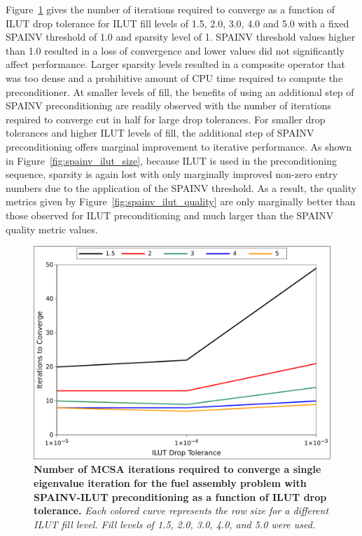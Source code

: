 Figure~\ref{fig:spainv_ilut_iterations} gives the number of iterations
required to converge as a function of ILUT drop tolerance for ILUT
fill levels of 1.5, 2.0, 3.0, 4.0 and 5.0 with a fixed SPAINV
threshold of 1.0 and sparsity level of 1. SPAINV threshold values
higher than 1.0 resulted in a loss of convergence and lower values did
not significantly affect performance. Larger sparsity levels resulted
in a composite operator that was too dense and a prohibitive amount of
CPU time required to compute the preconditioner. At smaller levels of
fill, the benefits of using an additional step of SPAINV
preconditioning are readily observed with the number of iterations
required to converge cut in half for large drop tolerances. For
smaller drop tolerances and higher ILUT levels of fill, the additional
step of SPAINV preconditioning offers marginal improvement to
iterative performance. As shown in Figure~\ref{fig:spainv_ilut_size},
because ILUT is used in the preconditioning sequence, sparsity is
again lost with only marginally improved non-zero entry numbers due to
the application of the SPAINV threshold. As a result, the quality
metrics given by Figure~\ref{fig:spainv_ilut_quality} are only
marginally better than those observed for ILUT preconditioning and
much larger than the SPAINV quality metric values.
\begin{figure}[t!]
  \begin{center}
    \includegraphics[width=6in]{chapters/spn_equations/psilut_iterations.pdf}
  \end{center}
  \caption{\textbf{Number of MCSA iterations required to converge a
      single eigenvalue iteration for the fuel assembly problem with
      SPAINV-ILUT preconditioning as a function of ILUT drop
      tolerance.} \textit{Each colored curve represents the row size
      for a different ILUT fill level. Fill levels of 1.5, 2.0, 3.0,
      4.0, and 5.0 were used.}}
  \label{fig:spainv_ilut_iterations}
\end{figure}

